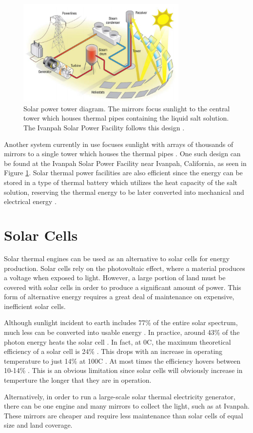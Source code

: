     \begin{figure}[H]
        \centering
        \includegraphics[width=0.75\textwidth]{diagrams/tower}
        \caption[Solar power tower]{Solar power tower diagram. The mirrors focus sunlight to the central tower which houses thermal pipes containing the liquid salt solution. The Ivanpah Solar Power Facility follows this design \cite{tower}.}
        \label{fig:ivanpah}
    \end{figure}
    
    Another system currently in use focuses sunlight with arrays of thousands of mirrors to a single tower which houses the thermal pipes \cite{eia:01}. One such design can be found at the Ivanpah Solar Power Facility near Ivanpah, California\cite{eia:01}, as seen in Figure \ref{fig:ivanpah}. Solar thermal power facilities are also efficient since the energy can be stored in a type of thermal battery which utilizes the heat capacity of the salt solution, reserving the thermal energy to be later converted into mechanical and electrical energy \cite{eia:01}.

\section{Solar Cells}

    Solar thermal engines can be used as an alternative to solar cells for energy production. Solar cells rely on the photovoltaic effect, where a material produces a voltage when exposed to light. However, a large portion of land must be covered with solar cells in order to produce a significant amount of power. This form of alternative energy requires a great deal of maintenance on expensive, inefficient solar cells.
    
    Although sunlight incident to earth includes 77\% of the entire solar spectrum, much less can be converted into usable energy \cite{energyenv}. In practice, around 43\% of the photon energy heats the solar cell \cite{energyenv}. In fact, at 0\degree C, the maximum theoretical efficiency of a solar cell is 24\% \cite{energyenv}. This drops with an increase in operating temperature to just 14\% at 100\degree C \cite{energyenv}. At most times the efficiency hovers between 10-14\% \cite{energyenv}. This is an obvious limitation since solar cells will obviously increase in temperture the longer that they are in operation.
    
    Alternatively, in order to run a large-scale solar thermal electricity generator, there can be one engine and many mirrors to collect the light, such as at Ivanpah. These mirrors are cheaper and require less maintenance than solar cells of equal size and land coverage.